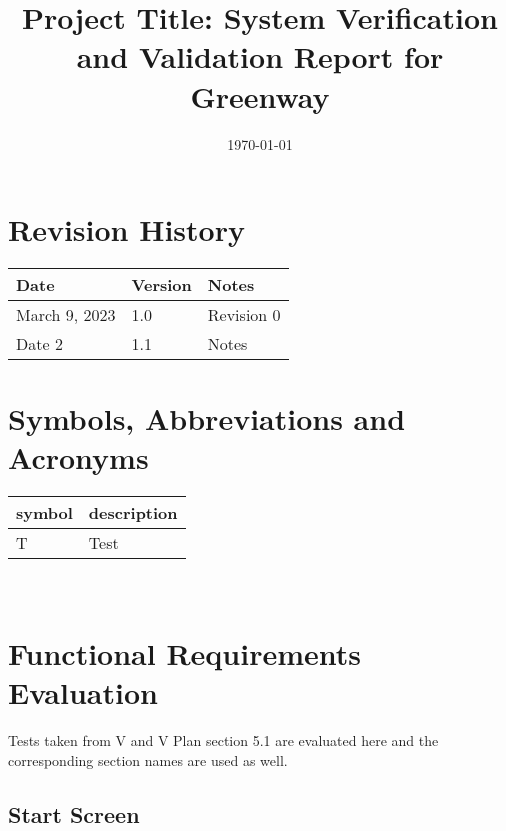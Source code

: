 \documentclass[12pt, titlepage]{article}
\begin{document}
\title{Project Title: System Verification and Validation Report for Greenway} 
\author{\authname{}}
\date{\today}
	
\maketitle


\tableofcontents

\newpage

\section{Revision History}

\begin{tabularx}{\textwidth}{p{3cm}p{2cm}X}
\toprule {\bf Date} & {\bf Version} & {\bf Notes}\\
\midrule
March 9, 2023 & 1.0 & Revision 0\\
Date 2 & 1.1 & Notes\\
\bottomrule
\end{tabularx}

\section{Symbols, Abbreviations and Acronyms}

\renewcommand{\arraystretch}{1.2}
\begin{tabular}{l l} 
  \toprule		
  \textbf{symbol} & \textbf{description}\\
  \midrule 
  T & Test\\
  \bottomrule
\end{tabular}\\

\newpage


\newpage


\section{Functional Requirements Evaluation}
Tests taken from V and V Plan section 5.1 are evaluated here and the corresponding section names are used as well.

\subsection{Start Screen}
\end{document}
